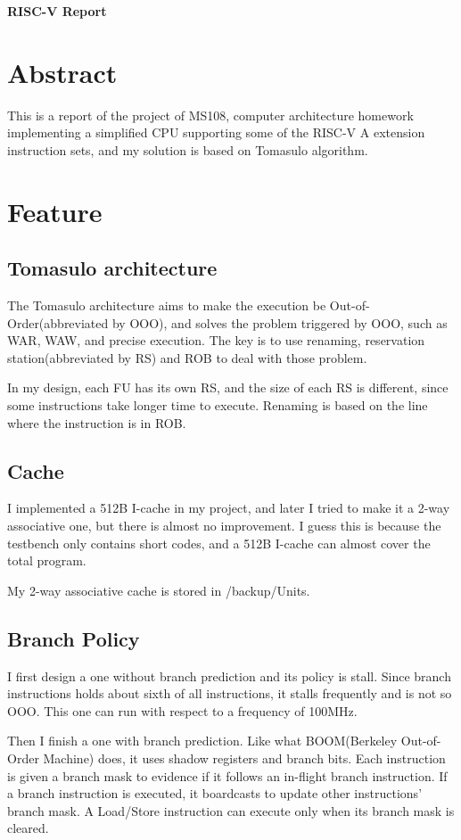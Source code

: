 \documentclass[12pt,letterpaper]{article}
\begin{document}
\textbf{\Large RISC-V Report}
\section{Abstract}
    This is a report of the project of MS108, computer architecture homework implementing a simplified CPU supporting some of the RISC-V 
    A extension instruction sets, and my solution is based on Tomasulo algorithm. 
\section{Feature}
\subsection{Tomasulo architecture}
    The Tomasulo architecture aims to make the execution be Out-of-Order(abbreviated by OOO), 
    and solves the problem triggered by OOO, such as WAR, WAW, and precise execution. The key is to use renaming, 
    reservation station(abbreviated by RS) and ROB to deal with those problem. 

    In my design, each FU has its own RS, and the size of each RS is different, since some instructions 
    take longer time to execute. Renaming is based on the line where the instruction is in ROB. 
\subsection{Cache}
    I implemented a 512B I-cache in my project, and later I tried to make it a 2-way associative one, but there is almost no improvement. 
    I guess this is because the testbench only contains short codes, and a 512B I-cache can almost cover the total program. 

    My 2-way associative cache is stored in /backup/Units. 
\subsection{Branch Policy}
    I first design a one without branch prediction and its policy is stall. Since branch instructions holds about sixth of all instructions, 
    it stalls frequently and is not so OOO. This one can run with respect to a frequency of 100MHz. 

    Then I finish a one with branch prediction. Like what BOOM(Berkeley Out-of-Order Machine) does, it uses shadow registers and branch bits. 
    Each instruction is given a branch mask to evidence if it follows an in-flight branch instruction. If a branch instruction is executed, 
    it boardcasts to update other instructions' branch mask. A Load/Store instruction can execute only when its branch mask is cleared. 
\end{document}
